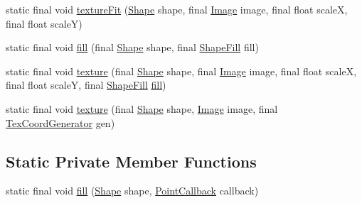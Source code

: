 \begin{DoxyCompactItemize}
static final void \mbox{\hyperlink{classorg_1_1newdawn_1_1slick_1_1geom_1_1_shape_renderer_a54f85a9dc90925fb89b2fffccdbd1b83}{texture\+Fit}} (\mbox{\hyperlink{classorg_1_1newdawn_1_1slick_1_1geom_1_1_shape}{Shape}} shape, final \mbox{\hyperlink{classorg_1_1newdawn_1_1slick_1_1_image}{Image}} image, final float scaleX, final float scaleY)
\item 
static final void \mbox{\hyperlink{classorg_1_1newdawn_1_1slick_1_1geom_1_1_shape_renderer_a9a7fb180ff23414255aa33ac68a9df9e}{fill}} (final \mbox{\hyperlink{classorg_1_1newdawn_1_1slick_1_1geom_1_1_shape}{Shape}} shape, final \mbox{\hyperlink{interfaceorg_1_1newdawn_1_1slick_1_1_shape_fill}{Shape\+Fill}} fill)
\item 
static final void \mbox{\hyperlink{classorg_1_1newdawn_1_1slick_1_1geom_1_1_shape_renderer_a6a26054fcde9db16bb592de8a283c032}{texture}} (final \mbox{\hyperlink{classorg_1_1newdawn_1_1slick_1_1geom_1_1_shape}{Shape}} shape, final \mbox{\hyperlink{classorg_1_1newdawn_1_1slick_1_1_image}{Image}} image, final float scaleX, final float scaleY, final \mbox{\hyperlink{interfaceorg_1_1newdawn_1_1slick_1_1_shape_fill}{Shape\+Fill}} \mbox{\hyperlink{classorg_1_1newdawn_1_1slick_1_1geom_1_1_shape_renderer_a798dd59aef1deb87fdfcc4fbff59ecef}{fill}})
\item 
static final void \mbox{\hyperlink{classorg_1_1newdawn_1_1slick_1_1geom_1_1_shape_renderer_a489aa5fb82693b7b688f42b2b1e4acbc}{texture}} (final \mbox{\hyperlink{classorg_1_1newdawn_1_1slick_1_1geom_1_1_shape}{Shape}} shape, \mbox{\hyperlink{classorg_1_1newdawn_1_1slick_1_1_image}{Image}} image, final \mbox{\hyperlink{interfaceorg_1_1newdawn_1_1slick_1_1geom_1_1_tex_coord_generator}{Tex\+Coord\+Generator}} gen)
\end{DoxyCompactItemize}
\subsection*{Static Private Member Functions}
\begin{DoxyCompactItemize}
\item 
static final void \mbox{\hyperlink{classorg_1_1newdawn_1_1slick_1_1geom_1_1_shape_renderer_a1d5b35119abcdbd5566e8b6f604aa931}{fill}} (\mbox{\hyperlink{classorg_1_1newdawn_1_1slick_1_1geom_1_1_shape}{Shape}} shape, \mbox{\hyperlink{interfaceorg_1_1newdawn_1_1slick_1_1geom_1_1_shape_renderer_1_1_point_callback}{Point\+Callback}} callback)
\end{DoxyCompactItemize}
